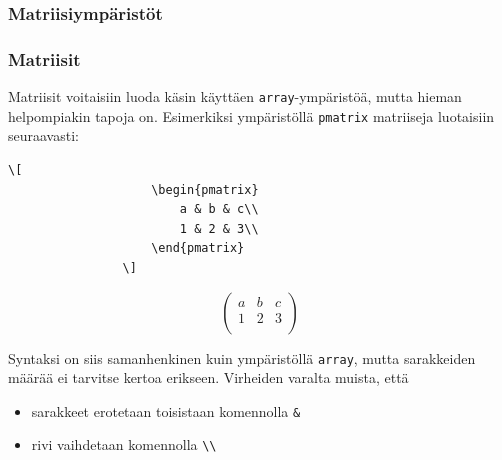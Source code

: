 \documentclass[handout,hyperref={colorlinks=true}]{beamer}
\theoremstyle{remark}
\begin{document}
\subsubsection{Matriisiympäristöt}
\begin{frame}[fragile]
    \frametitle{Matriisit}
    Matriisit voitaisiin luoda käsin käyttäen \verb-array--ympäristöä, mutta hieman helpompiakin tapoja on. Esimerkiksi ympäristöllä \verb-pmatrix- matriiseja luotaisiin seuraavasti:

    \begin{minipage}{4cm}
        \begin{scriptsize}
            \begin{Verbatim}[frame=single]
                \[
                    \begin{pmatrix}
                        a & b & c\\
                        1 & 2 & 3\\
                    \end{pmatrix}
                \]
            \end{Verbatim}
        \end{scriptsize}
    \end{minipage}
    \begin{minipage}{4cm}
        \[
            \begin{pmatrix}
                a & b & c\\
                1 & 2 & 3\\
            \end{pmatrix}
        \]
    \end{minipage}

Syntaksi on siis samanhenkinen kuin ympäristöllä \verb-array-, mutta sarakkeiden määrää ei tarvitse kertoa erikseen. Virheiden varalta muista, että
    \begin{itemize}
        \item sarakkeet erotetaan toisistaan komennolla \verb-&-
        \item rivi vaihdetaan komennolla \verb-\\-
    \end{itemize}

\end{frame}
\end{document}
